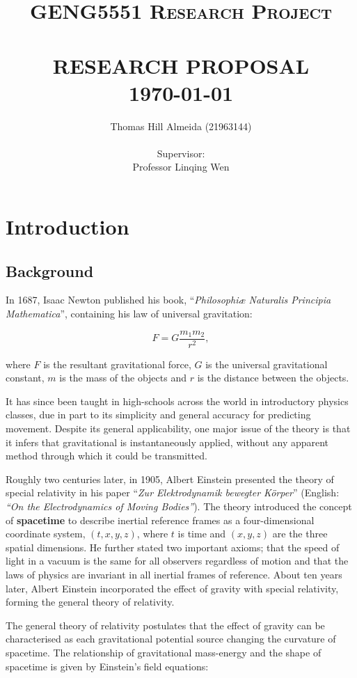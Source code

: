 \documentclass{article}
\title{\normalsize \textsc{GENG5551 Research Project}
        \\ [1.5cm]
        \HRule{0.5pt} \\
        \LARGE \textbf{\uppercase{Research Proposal}}
        \HRule{2pt} \\ [0.5cm]
        \normalsize \today \vspace*{3\baselineskip}}
\author{Thomas Hill Almeida (21963144)\\
\\
Supervisor:\\
Professor Linqing Wen
}
\date{}
\begin{document}
\maketitle{}
\tableofcontents{}
\newpage{}

\section{Introduction}
\subsection{Background}

In 1687, Isaac Newton published his book, ``\textit{Philosophi\ae{} Naturalis Principia
Mathematica}'', containing his law of universal gravitation:

\begin{equation}
    F = G\dfrac{m_1m_2}{r^2},
\end{equation}

where \(F\) is the resultant gravitational force, \(G\) is the universal gravitational constant,
\(m\) is the mass of the objects and \(r\) is the distance between the objects.

It has since been taught in high-schools across the world in introductory physics classes, due in
part to its simplicity and general accuracy for predicting movement. Despite its general
applicability, one major issue of the theory is that it infers that gravitational is instantaneously
applied, without any apparent method through which it could be transmitted.

Roughly two centuries later, in 1905, Albert Einstein presented the theory of special relativity
in his paper ``\textit{Zur Elektrodynamik bewegter K{\"o}rper}'' (English: \textit{``On the
Electrodynamics of Moving Bodies''}). The theory introduced the concept of \textbf{spacetime} to
describe inertial reference frames as a four-dimensional coordinate system, \((t, x, y, z)\), where
$t$ is time and \((x, y, z)\) are the three spatial dimensions. He further stated two important
axioms; that the speed of light in a vacuum is the same for all observers regardless of motion and
that the laws of physics are invariant in all inertial frames of reference. About ten years later,
Albert Einstein incorporated the effect of gravity with special relativity, forming the general
theory of relativity.

The general theory of relativity postulates that the effect of gravity can be characterised as each
gravitational potential source changing the curvature of spacetime. The relationship of
gravitational mass-energy and the shape of spacetime is given by Einstein's field equations:
\end{document}
